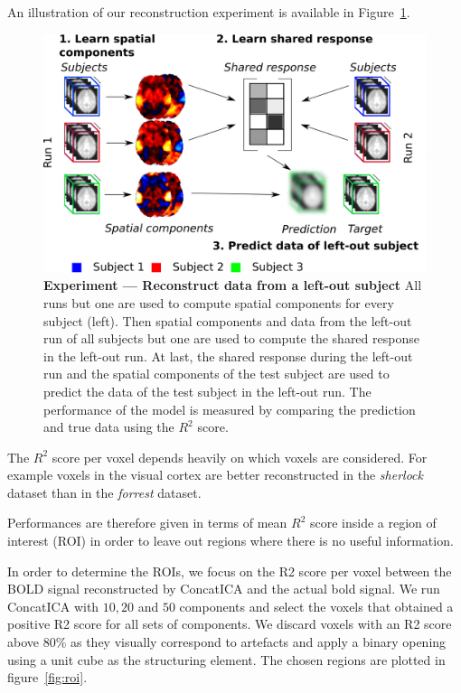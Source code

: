 An illustration of our reconstruction experiment is available in Figure~\ref{fig:conceptual:reconstruction}.

\begin{figure}
  \centering
  \includegraphics[scale=0.24]{figures/srm/conceptual_figure41.png}
  \caption{\textbf{Experiment — Reconstruct data from a left-out subject} All runs but one are used to compute spatial components for every subject (left).
    Then spatial components and data from the left-out run of all subjects but one are used to compute the shared response in the left-out run.
    At last, the shared response during the left-out run and  the spatial components of the test subject are used to predict the data of the test subject in the left-out run.
    The performance of the model is measured by comparing the prediction and true data using the $R^2$ score.}
  \label{fig:conceptual:reconstruction}
\end{figure}


The $R^2$ score per voxel depends heavily on which voxels are considered. For example voxels in the
visual cortex are better reconstructed in the \emph{sherlock} dataset than in
the \emph{forrest} dataset.

Performances are therefore given in terms of mean $R^2$ score inside a region of interest (ROI) in order to leave out regions where there is no useful information.

In order to determine the ROIs, we focus on the R2 score per voxel between the BOLD signal reconstructed by ConcatICA and the actual bold signal. We run ConcatICA with $10, 20$ and $50$ components and select the voxels that obtained a positive R2 score for all sets of components.
% 
We discard voxels with an R2 score above 80\% as they visually correspond to artefacts and apply a binary opening using a unit cube as the structuring element. The chosen regions are plotted in figure~\ref{fig:roi}.

